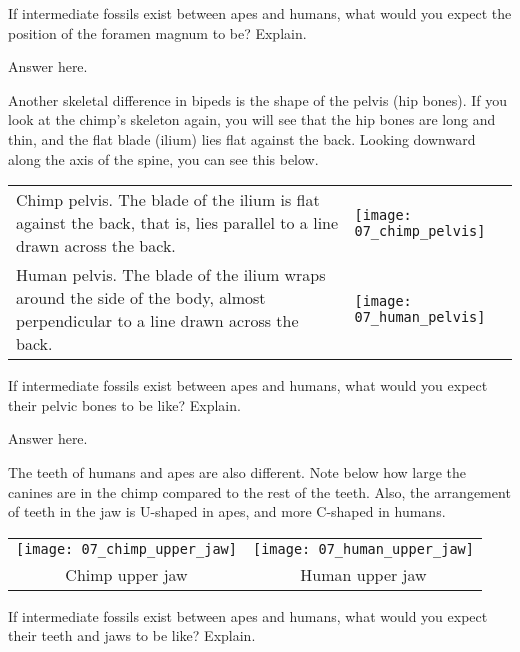 \documentclass[12pt, hidelinks]{exam}
\newcommand*\AnswerBox[2]{%
    \parbox[t][#1]{0.92\textwidth}{%
    \begin{solution}#2\end{solution}}
}
\begin{document}
\begin{questions}
\question[2]\label{foramen_prediction}
If intermediate fossils exist between apes and humans, what
would you expect the position of the foramen magnum to be? Explain.

\AnswerBox{4\baselineskip}{%
Answer here.
}


Another skeletal difference in bipeds is the shape of the pelvis (hip bones). If
you look at the chimp's skeleton again, you will see that the hip bones
are long and thin, and the flat blade (ilium) lies flat against the
back. Looking downward along the axis of the spine, you can see this
below.

\begin{longtable}[c]{@{}L{0.35\textwidth}L{0.6\textwidth}@{}}

Chimp pelvis. The blade of the ilium is flat against the back, that is,
lies parallel to a line drawn across the back. &

\texttt{[image: 07\_chimp\_pelvis]}\tabularnewline


Human pelvis. The blade of the ilium wraps around the side of the body,
almost perpendicular to a line drawn across the back.

 &
\texttt{[image: 07\_human\_pelvis]} \tabularnewline

\end{longtable}

\question[2]\label{pelvic_prediction}
If intermediate fossils exist between apes and humans, what
would you expect their pelvic bones to be like? Explain.

\AnswerBox{4\baselineskip}{%
Answer here.
}

The teeth of humans and apes are also different. Note below how large
the canines are in the chimp compared to the rest of the teeth. Also,
the arrangement of teeth in the jaw is {\sffamily U}-shaped in apes, 
and more {\sffamily C}-shaped in humans.

\begin{longtable}[c]{@{}cc@{}}
\texttt{[image: 07\_chimp\_upper\_jaw]} &
\texttt{[image: 07\_human\_upper\_jaw]} \tabularnewline
Chimp upper jaw &
Human upper jaw \tabularnewline

\end{longtable}

\question[2]\label{jaw_prediction}
If intermediate fossils exist between apes and humans, what would you expect their teeth and jaws to be like?  Explain. 


\end{questions}
\end{document}
